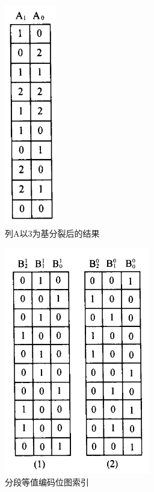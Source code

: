 \documentclass[11pt, a4paper]{article}
\begin{document}
  \begin{figure}[H]
    \centering
    \includegraphics[width=0.9in]{base.png}
    \caption{列A以3为基分裂后的结果}\label{fig:base}
  \end{figure}
  \begin{figure}[H]
    \centering
    \includegraphics[width=2.5in]{base2.png}
    \caption{分段等值编码位图索引}\label{fig:base2}
  \end{figure}
\end{document}
